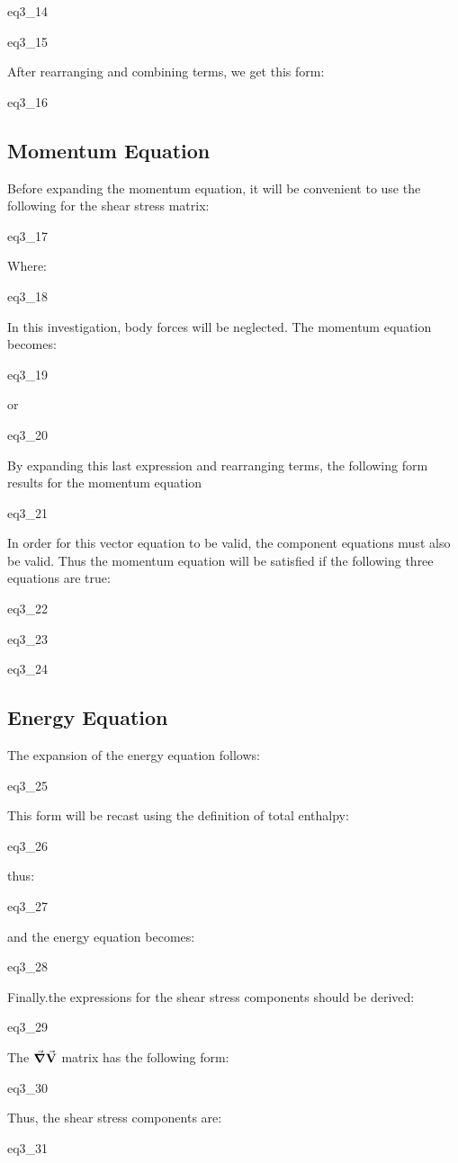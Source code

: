 {eq3_14}

{eq3_15}

After rearranging and combining terms, we get this form:

{eq3_16}

\subsection{Momentum Equation}

Before expanding the momentum equation, it will be convenient to use the
following for the shear stress matrix:

{eq3_17}

Where:

{eq3_18}

In this investigation, body forces will be neglected. The momentum equation becomes:

{eq3_19}

or

{eq3_20}

By expanding this last expression and rearranging terms, the following form
results for the momentum equation

{eq3_21}

In order for this vector equation to be valid, the component equations must also be valid. Thus the momentum equation will be satisfied if the following three equations are true:

{eq3_22}

{eq3_23}

{eq3_24}

\subsection{Energy Equation}

The expansion of the energy equation follows:

{eq3_25}

This form will be recast using the definition of total enthalpy:

{eq3_26}

thus:

{eq3_27}

and the energy equation becomes:

{eq3_28}

Finally.the expressions for the shear stress components should be derived:

{eq3_29}

The $\grad\va{V}$ matrix has the following form:

{eq3_30}

Thus, the shear stress components are:

{eq3_31}



